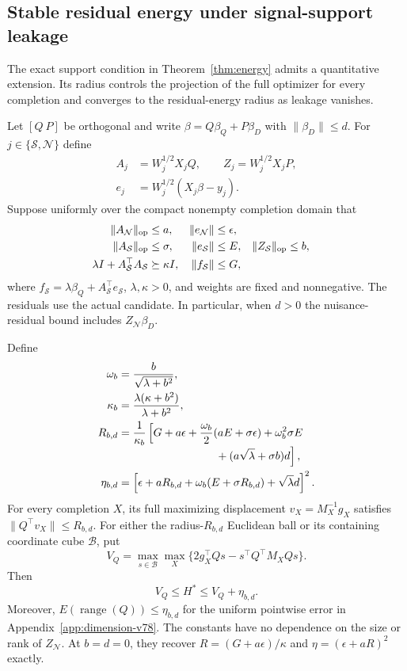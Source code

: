 \subsection{Stable residual energy under signal-support leakage}
\label{app:leakage-v79}
The exact support condition in Theorem~\ref{thm:energy} admits a quantitative extension. Its radius controls the projection of the full optimizer for every completion and converges to the residual-energy radius as leakage vanishes.

Let $[Q\ P]$ be orthogonal and write
$\beta=Q\beta_Q+P\beta_D$ with $\|\beta_D\|\le d$.
For $j\in\{\mathcal S,\mathcal N\}$ define
\begin{align*}
 A_j&=W_j^{1/2}X_jQ,\qquad Z_j=W_j^{1/2}X_jP,\\
 e_j&=W_j^{1/2}(X_j\beta-y_j).
\end{align*}
Suppose uniformly over the compact nonempty completion domain that
\begin{align*}
 \|A_{\mathcal N}\|_{\mathrm{op}}&\le a,&\|e_{\mathcal N}\|&\le\epsilon,\\
 \|A_{\mathcal S}\|_{\mathrm{op}}&\le\sigma,&\|e_{\mathcal S}\|&\le E,
 &\|Z_{\mathcal S}\|_{\mathrm{op}}&\le b,\\
 \lambda I+A_{\mathcal S}^\top A_{\mathcal S}&\succeq\kappa I,&
 \|f_{\mathcal S}\|&\le G,
\end{align*}
where $f_{\mathcal S}=\lambda\beta_Q+A_{\mathcal S}^\top e_{\mathcal S}$,
$\lambda,\kappa>0$, and weights are fixed and nonnegative.
The residuals use the actual candidate. In particular, when $d>0$ the nuisance-residual bound includes $Z_{\mathcal N}\beta_D$.

\begin{theorem}
\label{thm:energy-leakage-v79}
Define
\begin{align}
 \omega_b&=\frac{b}{\sqrt{\lambda+b^2}},\nonumber\\
 \kappa_b&=\frac{\lambda(\kappa+b^2)}{\lambda+b^2},
 \label{eq:leakage-contractions-v79}\\
 R_{b,d}&=\frac{1}{\kappa_b}\left[
 G+a\epsilon+\frac{\omega_b}{2}(aE+\sigma\epsilon)
 +\omega_b^2\sigma E\right.\nonumber\\[-1mm]
 &\hspace{30mm}\left.{}+(a\sqrt\lambda+\sigma b)d\right],
 \label{eq:leakage-radius-v79}\\
 \eta_{b,d}&=\left[\epsilon+aR_{b,d}
 +\omega_b(E+\sigma R_{b,d})+\sqrt\lambda d\right]^2.
 \label{eq:leakage-tail-v79}
\end{align}
For every completion $X$, its full maximizing displacement
$v_X=M_X^{-1}g_X$ satisfies $\|Q^\top v_X\|\le R_{b,d}$.
For either the radius-$R_{b,d}$ Euclidean ball or its containing coordinate cube $\mathcal B$, put
\[
 V_Q=\max_{s\in\mathcal B}\max_X
 \{2g_X^\top Qs-s^\top Q^\top M_XQs\}.
\]
Then
\[
 V_Q\le H^*\le V_Q+\eta_{b,d}.
\]
Moreover, $E(\operatorname{range}(Q))\le\eta_{b,d}$ for the uniform pointwise error in Appendix~\ref{app:dimension-v78}.
The constants have no dependence on the size or rank of $Z_{\mathcal N}$.
At $b=d=0$, they recover $R=(G+a\epsilon)/\kappa$ and $\eta=(\epsilon+aR)^2$ exactly.
\end{theorem}

